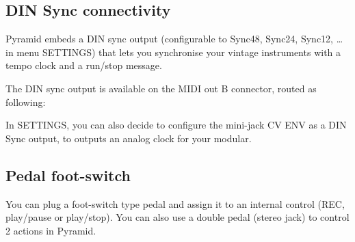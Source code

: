 \subsection{DIN Sync connectivity}


Pyramid embeds a DIN sync output (configurable to Sync48, Sync24, Sync12, \ldots in menu SETTINGS) that lets you synchronise your vintage instruments with a tempo clock and a run/stop message.

The DIN sync output is available on the MIDI out B connector, routed as following:


In SETTINGS, you can also decide to configure the mini-jack CV ENV as a DIN Sync output, to outputs an analog clock for your modular.


\subsection{Pedal foot-switch}


You can plug a foot-switch type pedal and assign it to an internal control (REC, play/pause or play/stop). You can also use a double pedal (stereo jack) to control 2 actions in Pyramid.
